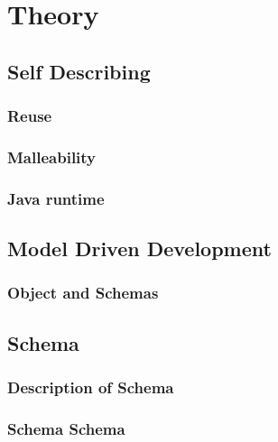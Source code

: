 \chapter{Theory}\label{Theory}

\section{Self Describing}\label{Self Describing}
\subsection{Reuse}
\subsection{Malleability}
\subsection{Java runtime}

\section{Model Driven Development}\label{MDD}
\subsection{Object and Schemas}

\section{Schema}

\subsection{Description of Schema}

\subsection{Schema Schema}

